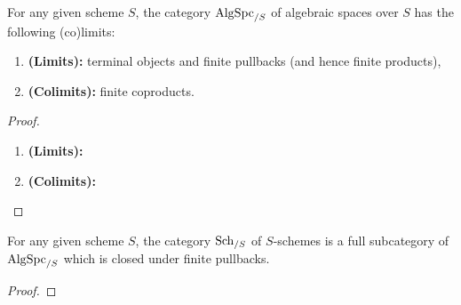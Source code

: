             \begin{proposition} \label{prop: (co)limits_of_algebraic_spaces}
                For any given scheme $S$, the category $\mathrm{Alg}\mathrm{Spc}_{/S}$ of algebraic spaces over $S$ has the following (co)limits:
                    \begin{enumerate}
                        \item \textbf{(Limits):} terminal objects and finite pullbacks (and hence finite products),
                        \item \textbf{(Colimits):} finite coproducts.
                    \end{enumerate}
            \end{proposition}
                \begin{proof}
                    \noindent
                    \begin{enumerate}
                        \item \textbf{(Limits):} 
                        \item \textbf{(Colimits):} 
                    \end{enumerate}
                \end{proof}
            \begin{corollary} \label{coro: schemes_are_algebraic_spaces}
                For any given scheme $S$, the category $\mathrm{Sch}_{/S}$ of $S$-schemes is a full subcategory of $\mathrm{Alg}\mathrm{Spc}_{/S}$ which is closed under finite pullbacks.
            \end{corollary}
            \begin{proposition} \label{prop: more_on_coproducts_of_algebraic_spaces}
                
            \end{proposition}
                \begin{proof}
                    
                \end{proof}
                
